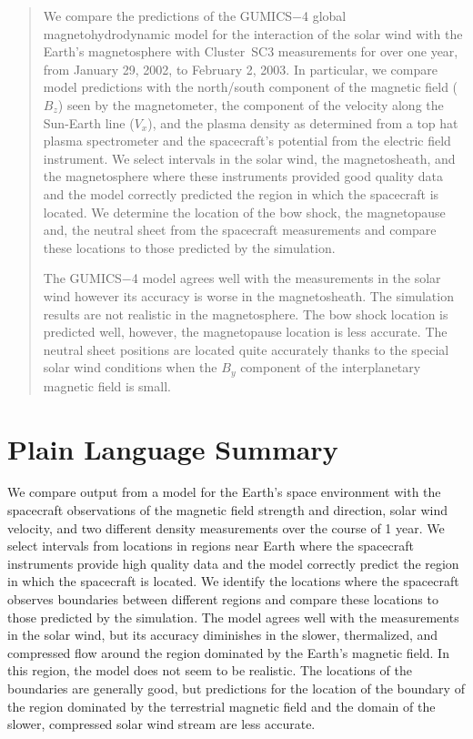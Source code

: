 \documentclass[draft]{agujournal2019}
\begin{document}
\begin{abstract}
We compare the predictions of the GUMICS$-$4 global magnetohydrodynamic model for the interaction of the solar wind with the Earth's magnetosphere with Cluster~SC3 measurements for over one year, from January 29, 2002, to February 2, 2003. In particular, we compare model predictions with the north/south component of the magnetic field ($B_{z}$) seen by the magnetometer, the component of the velocity along the Sun-Earth line ($V_{x}$), and the plasma density as determined from a top hat plasma spectrometer and the spacecraft's potential from the electric field instrument. We select intervals in the solar wind, the magnetosheath, and the magnetosphere where these instruments provided good quality data and the model correctly predicted the region in which the spacecraft is located. We determine the location of the bow shock, the magnetopause and, the neutral sheet from the spacecraft measurements and compare these locations to those predicted by the simulation.

The GUMICS$-$4 model agrees well with the measurements in the solar wind however its accuracy is worse in the magnetosheath. The simulation results are not realistic in the magnetosphere. The bow shock location is predicted well, however, the magnetopause location is less accurate. The neutral sheet positions are located quite accurately thanks to the special solar wind conditions when the $B_{y}$ component of the interplanetary magnetic field is small. 
\end{abstract}

\section*{Plain Language Summary}

We compare output from a model for the Earth's space environment with the spacecraft observations of the magnetic field strength and direction, solar wind velocity, and two different density measurements over the course of 1 year. We select intervals from locations in regions near Earth where the spacecraft instruments provide high quality data and the model correctly predict the region in which the spacecraft is located. We identify the locations where the spacecraft observes boundaries between different regions and compare these locations to those predicted by the simulation. The model agrees well with the measurements in the solar wind, but its accuracy diminishes in the slower, thermalized, and compressed flow around the region dominated by the Earth's magnetic field. In this region, the model does not seem to be realistic. The locations of the boundaries are generally good, but predictions for the location of the boundary of the region dominated by the terrestrial magnetic field and the domain of the slower, compressed solar wind stream are less accurate. 
\end{document}
